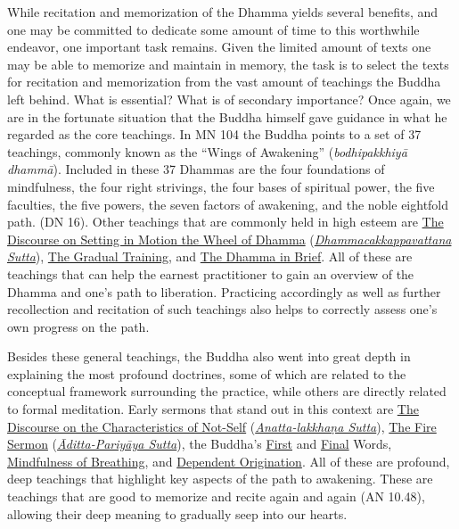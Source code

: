 While recitation and memorization of the Dhamma yields several benefits, and one may be committed to dedicate some amount of time to this worthwhile endeavor, one important task remains. Given the limited amount of texts one may be able to memorize and maintain in memory, the task is to select the texts for recitation and memorization from the vast amount of teachings the Buddha left behind. What is essential? What is of secondary importance? Once again, we are in the fortunate situation that the Buddha himself gave guidance in what he regarded as the core teachings. In MN 104 the Buddha points to a set of 37 teachings, commonly known as the ``Wings of Awakening'' (\textit{bodhipakkhiyā dhammā}). Included in these 37 Dhammas are the four foundations of mindfulness, the four right strivings, the four bases of spiritual power, the five faculties, the five powers, the seven factors of awakening, and the noble eightfold path. (DN 16). Other teachings that are commonly held in high esteem are \hyperref[wheel-of-dhamma-full]{The Discourse on Setting in Motion the Wheel of Dhamma} (\hyperref[dhammacakkappavattana-full]{\textit{Dhammacakkappavattana Sutta}}), \hyperref[gradual-training]{The Gradual Training}, and \hyperref[dhamma-in-brief]{The Dhamma in Brief}. All of these are teachings that can help the earnest practitioner to gain an overview of the Dhamma and one's path to liberation. Practicing accordingly as well as further recollection and recitation of such teachings also helps to correctly assess one's own progress on the path.

Besides these general teachings, the Buddha also went into great depth in explaining the most profound doctrines, some of which are related to the conceptual framework surrounding the practice, while others are directly related to formal meditation. Early sermons that stand out in this context are \hyperref[characteristic-of-not-self]{The Discourse on the Characteristics of Not-Self} (\hyperref[anatta-lakkhana]{\textit{Anatta-lakkhaṇa Sutta}}), \hyperref[fire-sermon]{The Fire Sermon} (\hyperref[aditta-pariyaya]{\textit{Āditta-Pariyāya Sutta}}), the Buddha's \hyperref[buddhas-first-exclamation]{First} and \hyperref[buddhas-final-instruction]{Final} Words, \hyperref[mindfulness-of-breathing]{Mindfulness of Breathing}, and \hyperref[dependent-origination]{Dependent Origination}. All of these are profound, deep teachings that highlight key aspects of the path to awakening. These are teachings that are good to memorize and recite again and again (AN 10.48), allowing their deep meaning to gradually seep into our hearts.

